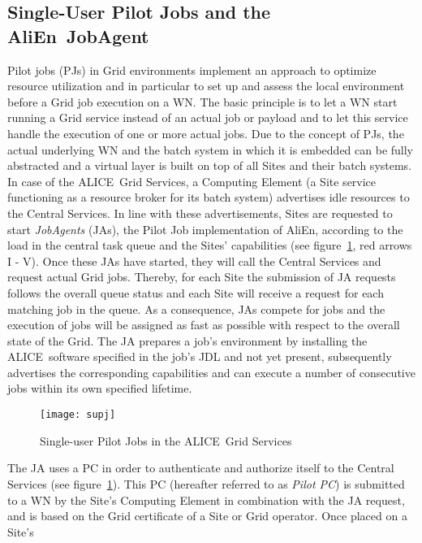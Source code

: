 \documentclass[10pt]{iopart}
\newcommand{\alice}{ALICE}
\newcommand{\alien}{AliEn}
\begin{document}
\subsection{Single-User Pilot Jobs and the \alien\ JobAgent}
\label{pilots}
Pilot jobs (PJs) in Grid environments
implement an approach to optimize resource utilization and in particular to
set up and assess the local environment before a Grid job execution
on a WN. The basic principle is to let a WN
start running a Grid service instead of an actual job or payload and to
let this service handle the execution of one or more actual jobs.
Due to the
concept of PJs, the actual
underlying WN and the batch system in which it is embedded can be fully
abstracted and a virtual layer is
built on top of all Sites and their batch systems.\\
In case of the \alice\ Grid Services, a Computing Element (a
Site service functioning as a resource broker for its batch system) advertises
idle resources to the Central Services. In line with these advertisements, Sites are
requested to start \textit{JobAgents} (JAs), the Pilot Job implementation of
\alien, according to the load in the central task queue and the Sites'
capabilities (see figure~\ref{supj}, red arrows I - V). Once these JAs have started,
they will call the Central Services and request actual Grid jobs. Thereby,
for each Site the 
submission of JA requests follows the overall queue status and
each Site will receive a request for each matching job
in the queue. As a consequence, 
JAs compete for jobs and the execution of jobs will be
assigned as fast as possible with respect to
the overall state of the Grid. The JA prepares a job's environment by
installing the \alice\ software specified in the job's JDL and not yet present,
subsequently advertises the corresponding 
capabilities and can execute a number of consecutive jobs
within its own specified lifetime.\\
\begin{figure}[h]
\begin{center}
\texttt{[image: supj]}
\caption{\label{supj}Single-user Pilot Jobs in the \alice\ Grid Services}
\end{center}
\end{figure}
The JA uses a PC in order to authenticate and authorize itself to the
Central Services (see figure~\ref{supj}). This PC (hereafter
referred to as \textit{Pilot PC}) is submitted to a WN by the
Site's Computing Element in combination with the JA request, and is based on
the Grid certificate of a Site or Grid operator. Once placed on a Site's
\end{document}

